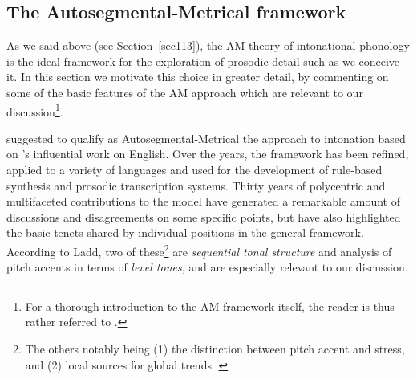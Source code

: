\subsection{The Autosegmental-Metrical framework}\label{sec122}
As we said above (see Section~\ref{sec113}), the AM theory of intonational phonology is the ideal framework for the exploration of prosodic detail such as we conceive it. In this section we motivate this choice in greater detail, by commenting on some of the basic features of the AM approach which are relevant to our discussion\footnote{For a thorough introduction to the AM framework itself, the reader is thus rather referred to \citet{shattuck1996prosody,gussenhoven2004phonology,ladd1996intonational,ladd2008intonational}.}.

\citet{ladd1996intonational} suggested to qualify as Autosegmental-Metrical the approach to intonation based on \citeauthor{pierrehumbert1980phonology}'s \citeyear{pierrehumbert1980phonology} influential work on English. Over the years, the framework has been refined, applied to a variety of languages and used for the development of rule-based synthesis and prosodic transcription systems. Thirty years of polycentric and multifaceted contributions to the model have generated a remarkable amount of discussions and disagreements on some specific points, but have also highlighted the basic tenets shared by individual positions in the general framework. According to Ladd, two of these\footnote{The others notably being (1) the distinction between pitch accent and stress, and (2) local sources for global trends \cite[44, which is the source for the other quotes in this section, unless otherwise specified]{ladd2008intonational}.} are \textit{sequential tonal structure} and analysis of pitch accents in terms of \textit{level tones}, and are especially relevant to our discussion.

